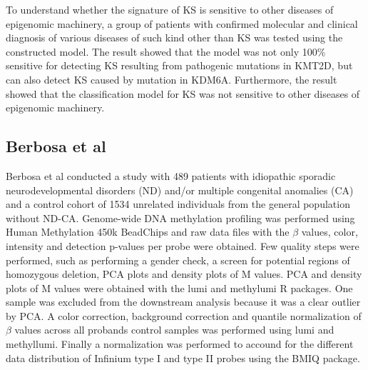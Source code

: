 To understand whether the signature of KS is sensitive to other diseases of epigenomic machinery, a group of patients with confirmed molecular and clinical diagnosis of various diseases of such kind other than KS was tested using the constructed model. The result showed that the model was not only 100\% sensitive for detecting KS resulting from pathogenic mutations in KMT2D, but can also detect KS caused by mutation in KDM6A. Furthermore, the result showed that the classification model for KS was not sensitive to other diseases of epigenomic machinery.







\subsection{Berbosa et al}
Berbosa et al \cite{barbosa2018identification} conducted a study with 489 patients with idiopathic sporadic neurodevelopmental disorders (ND) and/or multiple congenital anomalies (CA) and a control cohort of 1534 unrelated individuals from the general population without ND-CA. 
Genome-wide DNA methylation profiling was performed using Human Methylation 450k BeadChips and raw data files with the $\beta$ values, color, intensity and detection p-values per probe were obtained. Few quality steps were performed, such as performing a gender check, a screen for potential regions of homozygous deletion, PCA plots and density plots of M values. PCA and density plots of M values were obtained with the lumi and methylumi R packages. One sample was excluded from the downstream analysis because it was a clear outlier by PCA. A color correction, background correction and quantile normalization of $\beta$ values across all probands control samples was performed using lumi and methyllumi. Finally a normalization was performed to accound for the different data distribution of Infinium type I and type II probes using the BMIQ package.


